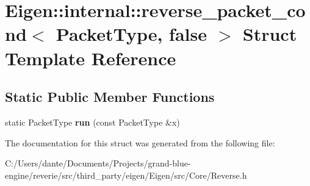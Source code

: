 \hypertarget{struct_eigen_1_1internal_1_1reverse__packet__cond_3_01_packet_type_00_01false_01_4}{}\section{Eigen\+::internal\+::reverse\+\_\+packet\+\_\+cond$<$ Packet\+Type, false $>$ Struct Template Reference}
\label{struct_eigen_1_1internal_1_1reverse__packet__cond_3_01_packet_type_00_01false_01_4}
\subsection*{Static Public Member Functions}
\begin{DoxyCompactItemize}
\item 
\mbox{\label{struct_eigen_1_1internal_1_1reverse__packet__cond_3_01_packet_type_00_01false_01_4_ac5e8467665d9f809e5c217bfaeeb259d}} 
static Packet\+Type {\bfseries run} (const Packet\+Type \&x)
\end{DoxyCompactItemize}


The documentation for this struct was generated from the following file\+:\begin{DoxyCompactItemize}
\item 
C\+:/\+Users/dante/\+Documents/\+Projects/grand-\/blue-\/engine/reverie/src/third\+\_\+party/eigen/\+Eigen/src/\+Core/Reverse.\+h\end{DoxyCompactItemize}
